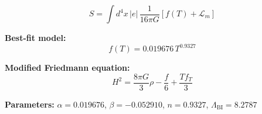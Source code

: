
\begin{equation}
  S = \int d^4x \, |e| \, \frac{1}{16\pi G} \left[ f(T) + \mathcal{L}_m \right]
\end{equation}

\textbf{Best-fit model:}
\begin{equation}
  f(T) = 0.019676 \, T^{0.9327}
\end{equation}

\textbf{Modified Friedmann equation:}
\begin{equation}
  H^2 = \frac{8\pi G}{3} \rho - \frac{f}{6} + \frac{T f_T}{3}
\end{equation}

\textbf{Parameters:}
$\alpha = 0.019676$, \quad
$\beta = -0.052910$, \quad
$n = 0.9327$, \quad
$\Lambda_{\text{BI}} = 8.2787$